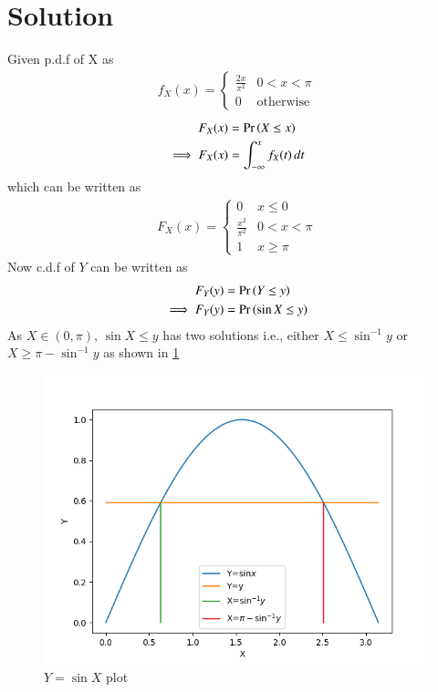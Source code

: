 \documentclass[journal,12pt,twocolumn]{IEEEtran}
\begin{document}
\section*{Solution}
Given p.d.f of X as
\begin{align}
    f_{X}(x)=\begin{cases} 
            \frac{2x}{\pi^2}  &  0<x<\pi\\
            0 & \text{otherwise}
            \end{cases} 
\end{align}
\begin{align}
    F_X(x) &= \Pr\left(X\leq x\right)\\
    \implies F_X(x) &= \int_{-\infty}^{x}f_X(t)\,dt
\end{align}
which can be written as
\begin{align}
    F_{X}(x)=\begin{cases} 
            0 & x\le 0\\
            \frac{x^2}{\pi^2}  &  0<x<\pi\\
            1 & x\ge \pi
            \end{cases}
            \label{a}
\end{align}
Now c.d.f of $Y$ can be written as 
\begin{align}
    F_Y(y) &= \Pr\left(Y\leq y\right)\\
    \implies F_Y(y) &= \Pr\left(\sin{X}\leq y\right)
\end{align}
As $X\in(0,\pi)$, $\sin{X}\leq y$ has two solutions i.e., either
 $X\leq \sin^{-1}{y}$ or $X\geq \pi-\sin^{-1}{y}$ as shown in \ref{plot}
 \begin{figure}[H]
     \centering
     \includegraphics[width=\linewidth]{plot.png}
     \caption{$Y=\sin X$ plot}
     \label{plot}
 \end{figure}
\end{document}
